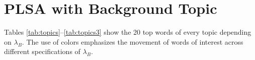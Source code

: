 \documentclass[11pt,a4paper,english,oneside]{book}
\numberwithin{equation}{chapter}
\begin{document}
%		  
 
 \section{PLSA with Background Topic}\label{AppendixC2}
 
Tables \ref{tab:topics}--\ref{tab:topics3} show the 20 top words of every topic depending on $\lambda_B$. The use of colors emphasizes the movement of words of interest across different specifications of  $\lambda_B$. 
\end{document}
